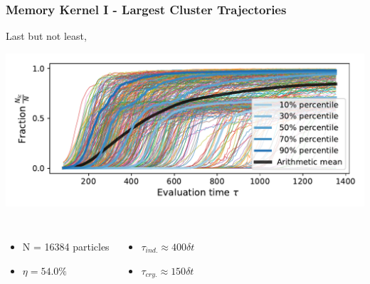 \documentclass[smaller,notes=hide]{beamer}
\newlength{\wideitemsep}
\let\olditem\item
\renewcommand{\item}{\setlength{\itemsep}{\wideitemsep}\olditem}
\begin{document}
\begin{frame}
\frametitle{Memory Kernel I - Largest Cluster Trajectories}
Last but not least,\\
\begin{center}
\includegraphics[width=0.7 \linewidth]{largest_cluster_trajectories.pdf}
\end{center}

\begin{columns}
\begin{itemize}
\item N = 16384 particles
\item $\eta = 54.0 \%$
\end{itemize}
\begin{itemize}
\item $\tau_{ind.} \approx 400 \delta t$
\item $\tau_{cry.} \approx 150 \delta t$
\end{itemize}
\end{columns}




\end{frame}
\end{document}
